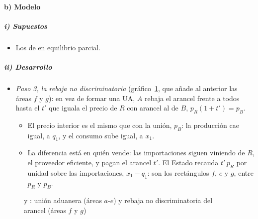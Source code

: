 \documentclass[11pt]{article}
\begin{document}
\paragraph{b) Modelo}

\subparagraph{i) Supuestos}

\begin{itemize}
\item Los de  en equilibrio parcial.
\end{itemize}

\subparagraph{ii) Desarrollo}

\begin{itemize}
\item \emph{Paso 3, la rebaja no discriminatoria} (gráfico~\ref{fig:viner-lipsey}, que añade al anterior las áreas $f$ y $g$): en vez de formar una UA, $A$ rebaja el arancel frente a todos hasta el $t'$ que iguala el precio de $R$ con arancel al de $B$, $p_R(1+t')=p_B$.
  \begin{itemize}
  \item El precio interior es el mismo que con la unión, $p_B$: la producción cae igual, a $q_1$, y el consumo sube igual, a $x_1$.
  \item La diferencia está en quién vende: las importaciones siguen viniendo de $R$, el proveedor eficiente, y pagan el arancel $t'$. El Estado recauda $t'\,p_R$ por unidad sobre las importaciones, $x_1-q_1$: son los rectángulos $f$, $e$ y $g$, entre $p_R$ y $p_B$.
  \end{itemize}
\end{itemize}

\begin{figure}[H]
\centering
\caption{ y : unión aduanera (áreas $a$-$e$) y rebaja no discriminatoria del arancel (áreas $f$ y $g$)}\label{fig:viner-lipsey}
\end{figure}
\end{document}
